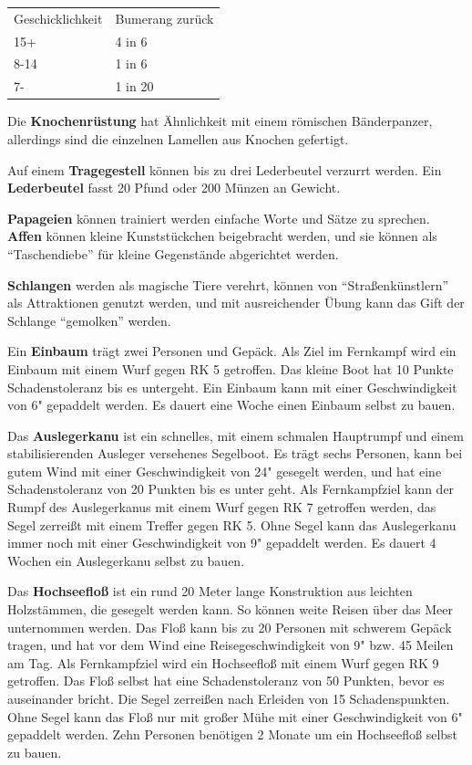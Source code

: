\documentclass[11pt]{wbzine}
\begin{document}
\begin{multicols}{2}
\begin{tabularx}{\columnwidth}{lZ}
    Geschicklichkeit & Bumerang zurück \\
    15+ & 4 in 6 \\
    8-14 & 1 in 6 \\
    7- & 1 in 20 \\
\end{tabularx}

Die \textbf{Knochenrüstung} hat Ähnlichkeit mit einem römischen
Bänderpanzer, allerdings sind die einzelnen Lamellen aus Knochen
gefertigt.

Auf einem \textbf{Tragegestell} können bis zu drei Lederbeutel
verzurrt werden. Ein \textbf{Lederbeutel} fasst 20 Pfund oder 200
Münzen an Gewicht.

\textbf{Papageien} können trainiert werden einfache Worte und Sätze
zu sprechen. \textbf{Affen} können kleine Kunststückchen beigebracht
werden, und sie können als ``Taschendiebe'' für kleine Gegenstände
abgerichtet werden.

\textbf{Schlangen} werden als magische Tiere verehrt, können von
``Straßenkünstlern'' als Attraktionen genutzt werden, und mit
ausreichender Übung kann das Gift der Schlange ``gemolken'' werden.

Ein \textbf{Einbaum} trägt zwei Personen und Gepäck. Als Ziel im
Fernkampf wird ein Einbaum mit einem Wurf gegen RK 5 getroffen. Das
kleine Boot hat 10 Punkte Schadenstoleranz bis es untergeht. Ein
Einbaum kann mit einer Geschwindigkeit von 6" gepaddelt werden. Es
dauert eine Woche einen Einbaum selbst zu bauen.

Das \textbf{Auslegerkanu} ist ein schnelles, mit einem schmalen
Hauptrumpf und einem stabilisierenden Ausleger versehenes Segelboot.
Es trägt sechs Personen, kann bei gutem Wind mit einer
Geschwindigkeit von 24" gesegelt werden, und hat eine
Schadenstoleranz von 20 Punkten bis es unter geht. Als Fernkampfziel
kann der Rumpf des Auslegerkanus mit einem Wurf gegen RK 7 getroffen
werden, das Segel zerreißt mit einem Treffer gegen RK 5. Ohne Segel
kann das Auslegerkanu immer noch mit einer Geschwindigkeit von 9"
gepaddelt werden. Es dauert 4 Wochen ein Auslegerkanu selbst zu
bauen.

Das \textbf{Hochseefloß} ist ein rund 20 Meter lange Konstruktion
aus leichten Holzstämmen, die gesegelt werden kann.  So können weite
Reisen über das Meer unternommen werden. Das Floß kann bis zu 
20 Personen mit schwerem Gepäck tragen, und hat vor dem Wind eine
Reisegeschwindigkeit von 9" bzw. 45 Meilen am Tag. Als Fernkampfziel
wird ein Hochseefloß mit einem Wurf gegen RK 9 getroffen. Das Floß
selbst hat eine Schadenstoleranz von 50 Punkten, bevor es
auseinander bricht. Die Segel zerreißen nach Erleiden von 15
Schadenspunkten. Ohne Segel kann das Floß nur mit großer Mühe mit
einer Geschwindigkeit von 6" gepaddelt werden. Zehn Personen
benötigen 2 Monate um ein Hochseefloß selbst zu bauen.



\end{multicols}
\end{document}
